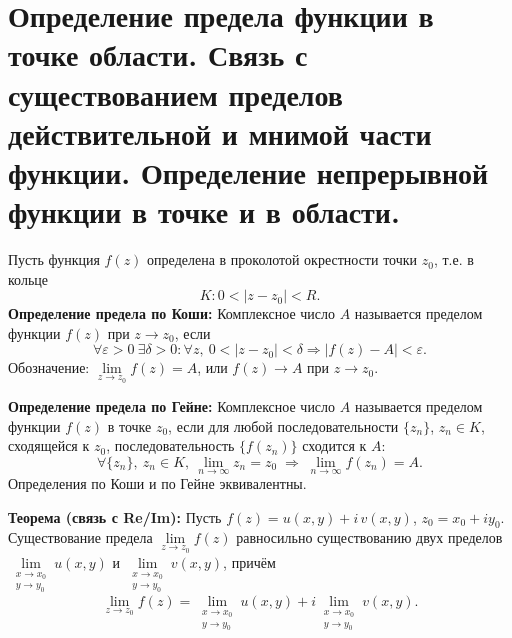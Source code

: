 \section{Определение предела функции в точке области. Связь с
существованием пределов действительной и мнимой части функции.
Определение непрерывной функции в точке и в
области.}\label{ux43eux43fux440ux435ux434ux435ux43bux435ux43dux438ux435-ux43fux440ux435ux434ux435ux43bux430-ux444ux443ux43dux43aux446ux438ux438-ux432-ux442ux43eux447ux43aux435-ux43eux431ux43bux430ux441ux442ux438.-ux441ux432ux44fux437ux44c-ux441-ux441ux443ux449ux435ux441ux442ux432ux43eux432ux430ux43dux438ux435ux43c-ux43fux440ux435ux434ux435ux43bux43eux432-ux434ux435ux439ux441ux442ux432ux438ux442ux435ux43bux44cux43dux43eux439-ux438-ux43cux43dux438ux43cux43eux439-ux447ux430ux441ux442ux438-ux444ux443ux43dux43aux446ux438ux438.-ux43eux43fux440ux435ux434ux435ux43bux435ux43dux438ux435-ux43dux435ux43fux440ux435ux440ux44bux432ux43dux43eux439-ux444ux443ux43dux43aux446ux438ux438-ux432-ux442ux43eux447ux43aux435-ux438-ux432-ux43eux431ux43bux430ux441ux442ux438.}

Пусть функция \(f(z)\) определена в проколотой окрестности точки
\(z_0\), т.е. в кольце \[K: 0 < |z - z_0| < R.\] \textbf{Определение
предела по Коши:} Комплексное число \(A\) называется пределом функции
\(f(z)\) при \(z \to z_0\), если
\[\forall \varepsilon > 0\ \exists \delta > 0: \forall z,\ 0 < |z - z_0| < \delta \Rightarrow |f(z) - A| < \varepsilon.\]
Обозначение: \(\lim\limits_{z \to z_0} f(z) = A\), или \(f(z) \to A\)
при \(z \to z_0\).

\textbf{Определение предела по Гейне:} Комплексное число \(A\)
называется пределом функции \(f(z)\) в точке \(z_0\), если для любой
последовательности \(\{z_n\}\), \(z_n \in K\), сходящейся к \(z_0\),
последовательность \(\{f(z_n)\}\) сходится к \(A\):
\[\forall \{z_n\},\ z_n \in K,\ \lim_{n\to\infty} z_n = z_0 \;\Rightarrow\; \lim_{n\to\infty} f(z_n) = A.\]
Определения по Коши и по Гейне эквивалентны.

\textbf{Теорема (связь с Re/Im):} Пусть \(f(z) = u(x,y) + i\,v(x,y)\),
\(z_0 = x_0 + i y_0\). Существование предела
\(\lim\limits_{z \to z_0} f(z)\) равносильно существованию двух пределов
\(\lim\limits_{\substack{x \to x_0 \\ y \to y_0}} u(x,y)\) и
\(\lim\limits_{\substack{x \to x_0 \\ y \to y_0}} v(x,y)\), причём
\[\lim_{z \to z_0} f(z) = \lim_{\substack{x \to x_0 \\ y \to y_0}} u(x,y) + i \lim_{\substack{x \to x_0 \\ y \to y_0}} v(x,y).\]


